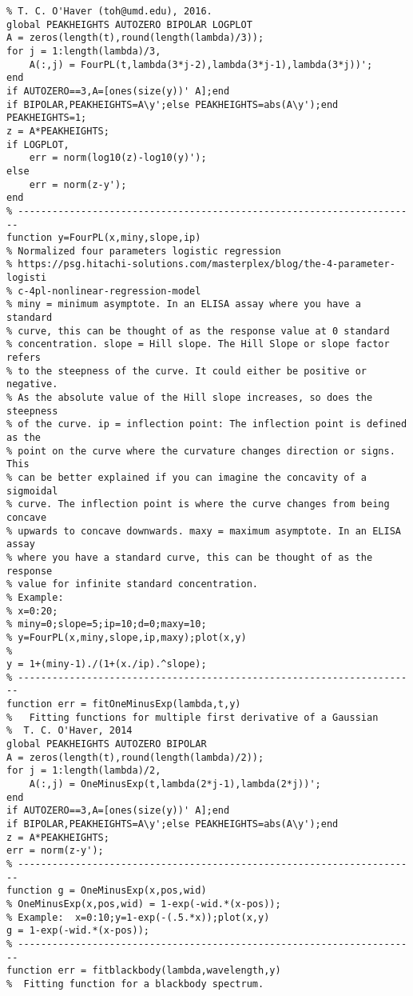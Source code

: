 \begin{lstlisting}
% T. C. O'Haver (toh@umd.edu), 2016.
global PEAKHEIGHTS AUTOZERO BIPOLAR LOGPLOT
A = zeros(length(t),round(length(lambda)/3));
for j = 1:length(lambda)/3,
    A(:,j) = FourPL(t,lambda(3*j-2),lambda(3*j-1),lambda(3*j))';
end
if AUTOZERO==3,A=[ones(size(y))' A];end
if BIPOLAR,PEAKHEIGHTS=A\y';else PEAKHEIGHTS=abs(A\y');end
PEAKHEIGHTS=1;
z = A*PEAKHEIGHTS;
if LOGPLOT,
    err = norm(log10(z)-log10(y)');
else
    err = norm(z-y');
end
% ----------------------------------------------------------------------
function y=FourPL(x,miny,slope,ip)
% Normalized four parameters logistic regression  
% https://psg.hitachi-solutions.com/masterplex/blog/the-4-parameter-logisti
% c-4pl-nonlinear-regression-model
% miny = minimum asymptote. In an ELISA assay where you have a standard
% curve, this can be thought of as the response value at 0 standard
% concentration. slope = Hill slope. The Hill Slope or slope factor refers
% to the steepness of the curve. It could either be positive or negative.
% As the absolute value of the Hill slope increases, so does the steepness
% of the curve. ip = inflection point: The inflection point is defined as the
% point on the curve where the curvature changes direction or signs. This
% can be better explained if you can imagine the concavity of a sigmoidal
% curve. The inflection point is where the curve changes from being concave
% upwards to concave downwards. maxy = maximum asymptote. In an ELISA assay
% where you have a standard curve, this can be thought of as the response
% value for infinite standard concentration.
% Example:
% x=0:20;
% miny=0;slope=5;ip=10;d=0;maxy=10;
% y=FourPL(x,miny,slope,ip,maxy);plot(x,y)
%
y = 1+(miny-1)./(1+(x./ip).^slope);
% ----------------------------------------------------------------------
function err = fitOneMinusExp(lambda,t,y)
%   Fitting functions for multiple first derivative of a Gaussian
%  T. C. O'Haver, 2014
global PEAKHEIGHTS AUTOZERO BIPOLAR
A = zeros(length(t),round(length(lambda)/2));
for j = 1:length(lambda)/2,
    A(:,j) = OneMinusExp(t,lambda(2*j-1),lambda(2*j))';
end
if AUTOZERO==3,A=[ones(size(y))' A];end
if BIPOLAR,PEAKHEIGHTS=A\y';else PEAKHEIGHTS=abs(A\y');end
z = A*PEAKHEIGHTS;
err = norm(z-y');
% ----------------------------------------------------------------------
function g = OneMinusExp(x,pos,wid)
% OneMinusExp(x,pos,wid) = 1-exp(-wid.*(x-pos));
% Example:  x=0:10;y=1-exp(-(.5.*x));plot(x,y)
g = 1-exp(-wid.*(x-pos));
% ----------------------------------------------------------------------
function err = fitblackbody(lambda,wavelength,y)
%  Fitting function for a blackbody spectrum.

\end{lstlisting}
